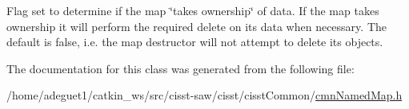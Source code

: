 Flag set to determine if the map \char`\"{}takes ownership\char`\"{} of data. If the map takes ownership it will perform the required {\ttfamily delete} on its data when necessary. The default is false, i.\-e. the map destructor will not attempt to delete its objects. 

The documentation for this class was generated from the following file\-:\begin{DoxyCompactItemize}
\item 
/home/adeguet1/catkin\-\_\-ws/src/cisst-\/saw/cisst/cisst\-Common/\hyperlink{cmn_named_map_8h}{cmn\-Named\-Map.\-h}\end{DoxyCompactItemize}
